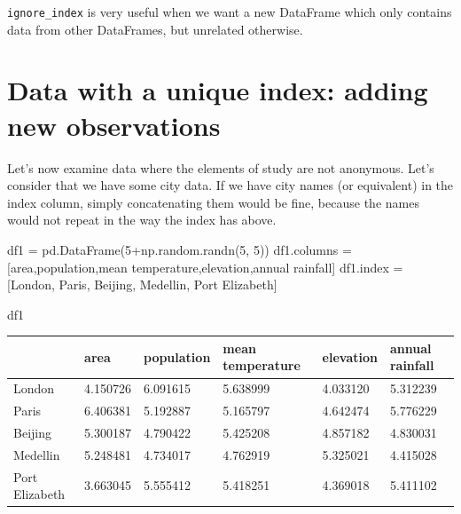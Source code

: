 \documentclass[
  letterpaper,
  DIV=11,
  numbers=noendperiod]{scrreprt}
\newenvironment{Shaded}{\begin{snugshade}}{\end{snugshade}}
\newcommand{\DecValTok}[1]{\textcolor[rgb]{0.68,0.00,0.00}{#1}}
\newcommand{\NormalTok}[1]{\textcolor[rgb]{0.00,0.23,0.31}{#1}}
\newcommand{\OperatorTok}[1]{\textcolor[rgb]{0.37,0.37,0.37}{#1}}
\newcommand{\StringTok}[1]{\textcolor[rgb]{0.13,0.47,0.30}{#1}}
\begin{document}
\texttt{ignore\_index} is very useful when we want a new DataFrame which
only contains data from other DataFrames, but unrelated otherwise.

\hypertarget{data-with-a-unique-index-adding-new-observations}{%
\section{Data with a unique index: adding new
observations}\label{data-with-a-unique-index-adding-new-observations}}

Let's now examine data where the elements of study are not anonymous.
Let's consider that we have some city data. If we have city names (or
equivalent) in the index column, simply concatenating them would be
fine, because the names would not repeat in the way the index has above.

\begin{Shaded}
\begin{Highlighting}[]
\NormalTok{df1 }\OperatorTok{=}\NormalTok{ pd.DataFrame(}\DecValTok{5}\OperatorTok{+}\NormalTok{np.random.randn(}\DecValTok{5}\NormalTok{, }\DecValTok{5}\NormalTok{))}
\NormalTok{df1.columns }\OperatorTok{=}\NormalTok{ [}\StringTok{\textquotesingle{}area\textquotesingle{}}\NormalTok{,}\StringTok{\textquotesingle{}population\textquotesingle{}}\NormalTok{,}\StringTok{\textquotesingle{}mean temperature\textquotesingle{}}\NormalTok{,}\StringTok{\textquotesingle{}elevation\textquotesingle{}}\NormalTok{,}\StringTok{\textquotesingle{}annual rainfall\textquotesingle{}}\NormalTok{]}
\NormalTok{df1.index }\OperatorTok{=}\NormalTok{ [}\StringTok{\textquotesingle{}London\textquotesingle{}}\NormalTok{, }\StringTok{\textquotesingle{}Paris\textquotesingle{}}\NormalTok{, }\StringTok{\textquotesingle{}Beijing\textquotesingle{}}\NormalTok{, }\StringTok{\textquotesingle{}Medellin\textquotesingle{}}\NormalTok{, }\StringTok{\textquotesingle{}Port Elizabeth\textquotesingle{}}\NormalTok{]}
\end{Highlighting}
\end{Shaded}

\begin{Shaded}
\begin{Highlighting}[]
\NormalTok{df1}
\end{Highlighting}
\end{Shaded}

\begin{longtable}[]{@{}llllll@{}}
\toprule\noalign{}
& area & population & mean temperature & elevation & annual rainfall \\
\midrule\noalign{}
\endhead
\bottomrule\noalign{}
\endlastfoot
London & 4.150726 & 6.091615 & 5.638999 & 4.033120 & 5.312239 \\
Paris & 6.406381 & 5.192887 & 5.165797 & 4.642474 & 5.776229 \\
Beijing & 5.300187 & 4.790422 & 5.425208 & 4.857182 & 4.830031 \\
Medellin & 5.248481 & 4.734017 & 4.762919 & 5.325021 & 4.415028 \\
Port Elizabeth & 3.663045 & 5.555412 & 5.418251 & 4.369018 & 5.411102 \\
\end{longtable}
\end{document}
